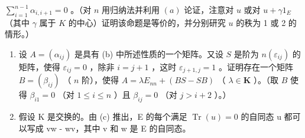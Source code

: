 \(\sum_{i=1}^{n-1} \alpha_{i, i+1} = 0\) 。（对 \(n\) 用归纳法并利用 \((a)\) 论证，注意对 \(u\) 或对 \(u + \gamma 1_{E}\) （其中 \(\gamma\) 属于 \(K\) 的中心）证明该命题是等价的，并分别研究 \(u\) 的秩为 1 或 2 的情形。）

\begin{enumerate}
\def\labelenumi{(\alph{enumi})}
\setcounter{enumi}{2}
\item
  设 \(A = (\alpha_{ij})\) 是具有 (b) 中所述性质的一个矩阵。又设 \(S\) 是阶为 \(n(\varepsilon_{ij})\) 的矩阵，使得 \(\varepsilon_{ij} = 0\) ，除非 \(i = j + 1\) ，这时 \(\varepsilon_{j+1,j} = 1\) 。证明存在一个矩阵 \(B = (\beta_{ij})\) （ \(n\) 阶），使得 \(A = \lambda E_{nn} + (BS - SB)\) （ \(\lambda \in \mathbf{K}\) ）。（取 \(B\) 使得 \(\beta_{i1} = 0\) （对 \(1 \leqslant i \leqslant n\) ）且 \(\beta_{ij} = 0\) （对 \(j > i + 2\) ）。）
\item
  假设 K 是交换的。由 (c) 推出，E 的每个满足 \(\operatorname{Tr}(u) = 0\) 的自同态 u 都可以写成 vw - wv，其中 v 和 w 是 E 的自同态。
\end{enumerate}

